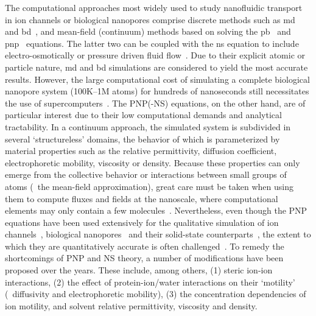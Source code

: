 The computational approaches most widely used to study nanofluidic transport in ion channels or biological
nanopores comprise discrete methods such as \gls{md}~\cite{Lynden-Bell-1996,Allen-1999,
Aksimentiev-2005,Luan-2008,Bhattacharya-2011,Zhang-2014,DiMarino-2015,Belkin-2016,Basdevant-2019,Cao-2019} and
\gls{bd}~\cite{Schirmer-1999,Im-2002,Noskov-2004,Millar-2008,Egwolf-2010,DeBiase-2015,Pederson-2015}, and
mean-field (continuum) methods based on solving the \gls{pb}~\cite{Grochowski-2008, Baldessari-2008-1} and
\gls{pnp}~\cite{Eisenberg-1996,Gillespie-2002,Simakov-2010} equations. The latter two can be coupled with the
\gls{ns} equation to include electro-osmotically or pressure driven fluid flow~\cite{Lu-2012,Pederson-2015}.
Due to their explicit atomic or particle nature, \gls{md} and \gls{bd} simulations are considered to yield the
most accurate results. However, the large computational cost of simulating a complete biological nanopore
system (100K--1M atoms) for hundreds of nanoseconds still necessitates the use of
supercomputers~\cite{Aksimentiev-2005,Bhattacharya-2011,Wilson-2019,Cao-2019}. The PNP(-NS) equations, on the
other hand, are of particular interest due to their low computational demands and analytical tractability. In
a continuum approach, the simulated system is subdivided in several `structureless' domains, the behavior of
which is parameterized by material properties such as the relative permittivity, diffusion coefficient,
electrophoretic mobility, viscosity or density. Because these properties can only emerge from the collective
behavior or interactions between small groups of atoms (\ie~the mean-field approximation), great care must be
taken when using them to compute fluxes and fields at the nanoscale, where computational elements may only
contain a few molecules~\cite{Corry-2000,Collins-2012}. Nevertheless, even though the PNP equations have been
used extensively for the qualitative simulation of ion channels~\cite{Im-2002,Furini-2006,Liu-2015},
biological nanopores~\cite{Simakov-2010,Pederson-2015, Aguilella-Arzo-2017,Simakov-2018} and their solid-state
counterparts~\cite{Cervera-2005,White-2008, Chaudhry-2014,Laohakunakorn-2015}, the extent to which they are
quantitatively accurate is often challenged~\cite{Corry-2000,Collins-2012,Maffeo-2012,Thomas-2014,Kim-2015}.
To remedy the shortcomings of PNP and NS theory, a number of modifications have been proposed over the years.
These include, among others, (1) steric ion-ion interactions, (2) the effect of protein-ion/water interactions
on their `motility' (\ie~diffusivity and electrophoretic mobility), (3) the concentration dependencies of ion
motility, and solvent relative permittivity, viscosity and density.

